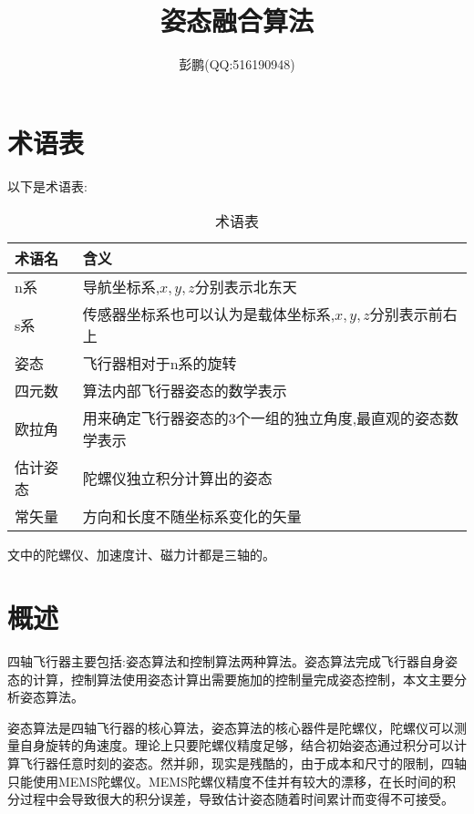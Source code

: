 \documentclass[12pt,a4paper]{article}
\title{姿态融合算法}
\author{彭鹏(QQ:516190948)}
\renewcommand{\citep}[1]{\textsuperscript{\cite{#1}}}
\begin{document}
\maketitle
\newpage
\tableofcontents
\newpage

\section{术语表} 
以下是术语表:
\begin{table}[!hbp]
\begin{center}
    \begin{tabular}{|l|l|}
        \hline
        术语名 & 含义 \\
        \hline
        n系 & 导航坐标系,$x,y,z$分别表示北东天 \\
        \hline
        s系 & 传感器坐标系也可以认为是载体坐标系,$x,y,z$分别表示前右上 \\
        \hline
        姿态 & 飞行器相对于n系的旋转 \\
        \hline
        四元数 & 算法内部飞行器姿态的数学表示 \\
        \hline
        欧拉角 & 用来确定飞行器姿态的3个一组的独立角度,最直观的姿态数学表示 \\
        \hline
        估计姿态 & 陀螺仪独立积分计算出的姿态 \\
        \hline
        常矢量 & 方向和长度不随坐标系变化的矢量 \\
        \hline
    \end{tabular}
    \caption{术语表\label{术语表}}
\end{center}
\end{table}

文中的陀螺仪、加速度计、磁力计都是三轴的。
\newpage

\section{概述}
四轴飞行器主要包括:姿态算法和控制算法两种算法。姿态算法完成飞行器自身姿态的计算，控制算法使用姿态计算出需要施加的控制量完成姿态控制，本文主要分析姿态算法。

姿态算法是四轴飞行器的核心算法，姿态算法的核心器件是陀螺仪，陀螺仪可以测量自身旋转的角速度。理论上只要陀螺仪精度足够，结合初始姿态通过积分可以计算飞行器任意时刻的姿态。然并卵，现实是残酷的，由于成本和尺寸的限制，四轴只能使用MEMS陀螺仪。MEMS陀螺仪精度不佳并有较大的漂移，在长时间的积分过程中会导致很大的积分误差，导致估计姿态随着时间累计而变得不可接受\citep{捷联惯导航}。
\end{document}
